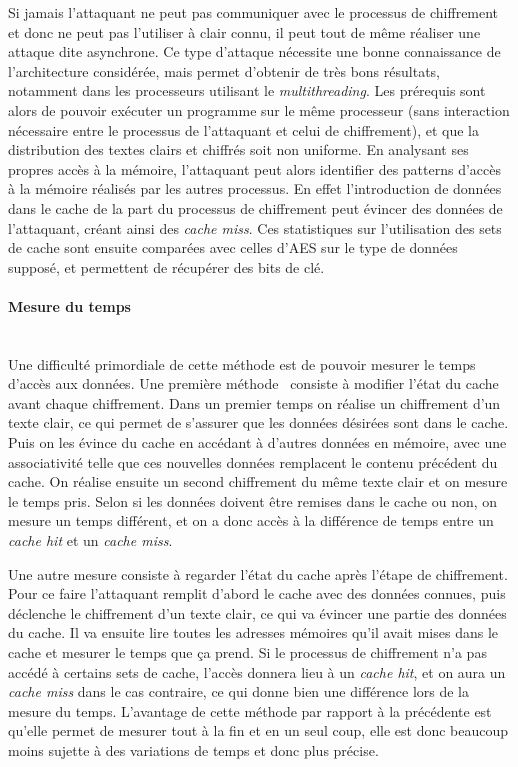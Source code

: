 \documentclass[a4paper,11pt]{article}
\begin{document}
Si jamais l'attaquant ne peut pas communiquer avec le processus de chiffrement et donc ne peut pas l'utiliser à clair connu, il peut tout de même réaliser une attaque dite asynchrone. Ce type d'attaque nécessite une bonne connaissance de l'architecture considérée, mais permet d'obtenir de très bons résultats, notamment dans les processeurs utilisant le \emph{multithreading}. Les prérequis sont alors de pouvoir exécuter un programme sur le même processeur (sans interaction nécessaire entre le processus de l'attaquant et celui de chiffrement), et que la distribution des textes clairs et chiffrés soit non uniforme. En analysant ses propres accès à la mémoire, l'attaquant peut alors identifier des patterns d'accès à la mémoire réalisés par les autres processus. En effet l'introduction de données dans le cache de la part du processus de chiffrement peut évincer des données de l'attaquant, créant ainsi des \emph{cache miss}. Ces statistiques sur l'utilisation des sets de cache sont ensuite comparées avec celles d'AES sur le type de données supposé, et permettent de récupérer des bits de clé. 

\paragraph{Mesure du temps} ~\\
Une difficulté primordiale de cette méthode est de pouvoir mesurer le temps d'accès aux données. Une première méthode~\cite{osvik2006cache} consiste à modifier l'état du cache avant chaque chiffrement. Dans un premier temps on réalise un chiffrement d'un texte clair, ce qui permet de s'assurer que les données désirées sont dans le cache. Puis on les évince du cache en accédant à d'autres données en mémoire, avec une associativité telle que ces nouvelles données remplacent le contenu précédent du cache. On réalise ensuite un second chiffrement du même texte clair et on mesure le temps pris. Selon si les données doivent être remises dans le cache ou non, on mesure un temps différent, et on a donc accès à la différence de temps entre un \emph{cache hit} et un \emph{cache miss}.

Une autre mesure consiste à regarder l'état du cache après l'étape de chiffrement. Pour ce faire l'attaquant remplit d'abord le cache avec des données connues, puis déclenche le chiffrement d'un texte clair, ce qui va évincer une partie des données du cache. Il va ensuite lire toutes les adresses mémoires qu'il avait mises dans le cache et mesurer le temps que ça prend. Si le processus de chiffrement n'a pas accédé à certains sets de cache, l'accès donnera lieu à un \emph{cache hit}, et on aura un \emph{cache miss} dans le cas contraire, ce qui donne bien une différence lors de la mesure du temps. L'avantage de cette méthode par rapport à la précédente est qu'elle permet de mesurer tout à la fin et en un seul coup, elle est donc beaucoup moins sujette à des variations de temps et donc plus précise.
\end{document}
